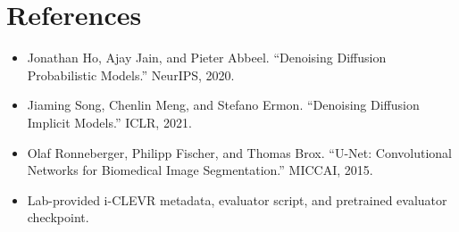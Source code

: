 \documentclass[12pt,a4paper]{article}
\begin{document}
\section*{References}
\begin{itemize}
    \item Jonathan Ho, Ajay Jain, and Pieter Abbeel. ``Denoising Diffusion
          Probabilistic Models.'' NeurIPS, 2020.
    \item Jiaming Song, Chenlin Meng, and Stefano Ermon. ``Denoising Diffusion
          Implicit Models.'' ICLR, 2021.
    \item Olaf Ronneberger, Philipp Fischer, and Thomas Brox. ``U-Net:
          Convolutional Networks for Biomedical Image Segmentation.'' MICCAI,
          2015.
    \item Lab-provided i-CLEVR metadata, evaluator script, and pretrained
          evaluator checkpoint.
\end{itemize}
\end{document}
